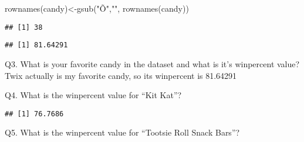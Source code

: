 \documentclass[
]{article}
\newenvironment{Shaded}{\begin{snugshade}}{\end{snugshade}}
\newcommand{\FunctionTok}[1]{\textcolor[rgb]{0.00,0.00,0.00}{#1}}
\newcommand{\NormalTok}[1]{#1}
\newcommand{\OtherTok}[1]{\textcolor[rgb]{0.56,0.35,0.01}{#1}}
\newcommand{\SpecialCharTok}[1]{\textcolor[rgb]{0.00,0.00,0.00}{#1}}
\newcommand{\StringTok}[1]{\textcolor[rgb]{0.31,0.60,0.02}{#1}}
\begin{document}
\begin{Shaded}
\begin{Highlighting}[]
\FunctionTok{rownames}\NormalTok{(candy)}\OtherTok{\textless{}{-}}\FunctionTok{gsub}\NormalTok{(}\StringTok{"Õ"}\NormalTok{,}\StringTok{"\textquotesingle{}"}\NormalTok{, }\FunctionTok{rownames}\NormalTok{(candy))}
\end{Highlighting}
\end{Shaded}

\begin{Shaded}
\end{Shaded}

\begin{verbatim}
## [1] 38
\end{verbatim}

\begin{Shaded}
\end{Shaded}

\begin{verbatim}
## [1] 81.64291
\end{verbatim}

Q3. What is your favorite candy in the dataset and what is it's
winpercent value? Twix actually is my favorite candy, so its winpercent
is 81.64291

Q4. What is the winpercent value for ``Kit Kat''?

\begin{Shaded}
\end{Shaded}

\begin{verbatim}
## [1] 76.7686
\end{verbatim}

Q5. What is the winpercent value for ``Tootsie Roll Snack Bars''?

\begin{Shaded}
\end{Shaded}
\end{document}
